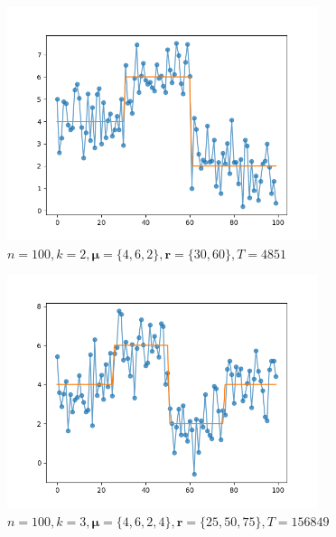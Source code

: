 \begin{figure}[H]
\begin{subfigure}{.3\textwidth}
	    \centering
    	\includegraphics[width=\linewidth]{../../plots/sequence_M3_N100_seed2_diffind2.png}
    	\caption{$n=100, k=2, \bm{\mu} = \{4, 6, 2\}, \bm{r} = \{30, 60\}, T = 4851$}
	\end{subfigure}
	\begin{subfigure}{.3\textwidth}
	    \centering
    	\includegraphics[width=\linewidth]{../../plots/sequence_M4_N100_seed3_diffind2.png}
    	\caption{$n=100, k=3, \bm{\mu} = \{4, 6, 2,4\}, \bm{r} = \{25, 50, 75\}, T = 156849$}
	\end{subfigure}
	\begin{subfigure}{.3\textwidth}
	    \centering

\end{subfigure}
\end{figure}

